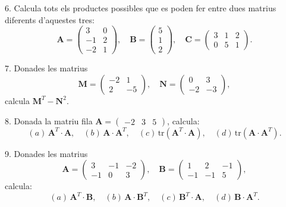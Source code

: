 \documentclass[12pt]{article}
\newcommand{\mat}[1]{\mathbf{#1}}
\begin{document}
\begin{exercici}
6. Calcula tots els productes possibles que es poden fer entre dues matrius diferents d'aquestes tres:
\[
\mat{A} = 
\begin{pmatrix}
3 & 0 \\
-1 & 2 \\
-2 & 1
\end{pmatrix}, \quad 
\mat{B} = 
\begin{pmatrix}
5 \\
1 \\
2
\end{pmatrix}, \quad 
\mat{C} = 
\begin{pmatrix}
3 & 1 & 2 \\
0 & 5 & 1
\end{pmatrix}.
\]
\end{exercici}

\begin{exercici}
7. Donades les matrius 
\[
\mat{M} = 
\begin{pmatrix}
-2 & 1 \\
2 & -5
\end{pmatrix}, \quad 
\mat{N} = 
\begin{pmatrix}
0 & 3 \\
-2 & -3
\end{pmatrix},
\]
calcula $\mat{M}^T - \mat{N}^2$.
\end{exercici}

\begin{exercici}
8. Donada la matriu fila $\mat{A} = \begin{pmatrix} -2 & 3 & 5 \end{pmatrix}$, calcula:
\[
(a) \, \mat{A}^T \cdot \mat{A}, \quad (b) \, \mat{A} \cdot \mat{A}^T, \quad (c) \, \text{tr}(\mat{A}^T \cdot \mat{A}), \quad (d) \, \text{tr}(\mat{A} \cdot \mat{A}^T).
\]
\end{exercici}

\begin{exercici}
9. Donades les matrius 
\[
\mat{A} = 
\begin{pmatrix}
3 & -1 & -2 \\
-1 & 0 & 3
\end{pmatrix}, \quad 
\mat{B} = 
\begin{pmatrix}
1 & 2 & -1 \\
-1 & -1 & 5
\end{pmatrix},
\]
calcula:
\[
(a) \, \mat{A}^T \cdot \mat{B}, \quad (b) \, \mat{A} \cdot \mat{B}^T, \quad (c) \, \mat{B}^T \cdot \mat{A}, \quad (d) \, \mat{B} \cdot \mat{A}^T.
\]
\end{exercici}
\end{document}
